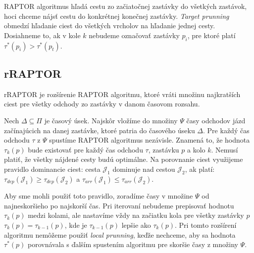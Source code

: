 RAPTOR algoritmus hľadá cestu zo začiatočnej zastávky do všetkých zastávok, hoci chceme nájsť cestu do konkrétnej konečnej zastávky. \textit{Target prunning} obmedzí hľadanie ciest do všetkých vrcholov na hľadanie jednej cesty. Dosiahneme to, ak v kole $k$ nebudeme označovať zastávky $p_i$, pre ktoré platí $\tau^*(p_i) > \tau^*(p_t)$.   

\subsection{rRAPTOR}
\label{sub:rraptor}
rRAPTOR je rozšírenie RAPTOR algoritmu, ktoré vráti množinu najkratších ciest pre všetky odchody zo zastávky v danom časovom rozsahu. 

Nech $\Delta \subseteq \Pi$ je časový úsek. Najskôr vložíme do množiny $\Psi$ časy odchodov jázd začínajúcich na danej zastávke, ktoré patria do časového úseku $\Delta$. Pre každý čas odchodu $\tau$ z $\Psi$ spustíme RAPTOR algoritmus nezávisle. Znamená to, že hodnota $\tau_k(p)$ bude existovať pre každý čas odchodu $\tau$, zastávku $p$ a kolo $k$. Nemusí platiť, že všetky nájdené cesty budú optimálne. Na porovnanie ciest využijeme pravidlo dominancie ciest: cesta $\mathcal{J}_1$ dominuje nad cestou $\mathcal{J}_2$, ak platí: $\tau_{dep}(\mathcal{J}_1) \geq \tau_{dep}(\mathcal{J}_2)$ a $\tau_{arr}(\mathcal{J}_1) \leq \tau_{arr}(\mathcal{J}_2)$. 

Aby sme mohli použiť toto pravidlo, zoradíme časy v množine $\Psi$ od najneskoršieho po najskorší čas. Pri iterovaní nebudeme prepisovať hodnotu $\tau_k(p)$ medzi kolami, ale nastavíme vždy na začiatku kola pre všetky zastávky $p$ $\tau_k(p) = \tau_{k-1}(p)$, kde je $\tau_{k-1}(p)$ lepšie ako $\tau_k(p)$. Pri tomto rozšírení algoritmu nemôžeme použiť \textit{local prunning}, keďže nechceme, aby sa hodnota $\tau^*(p)$ porovnávala s ďalším spustením algoritmu pre skoršie časy z množiny $\Psi$. 




